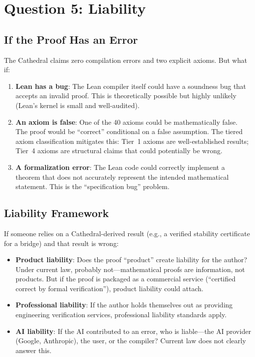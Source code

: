 \documentclass[11pt,a4paper]{article}
\begin{document}
\section{Question 5: Liability}
\label{sec:liability}

\subsection{If the Proof Has an Error}

The Cathedral claims zero compilation errors and two explicit
axioms. But what if:

\begin{enumerate}
  \item \textbf{Lean has a bug}: The Lean compiler itself could
    have a soundness bug that accepts an invalid proof. This is
    theoretically possible but highly unlikely (Lean's kernel is
    small and well-audited).

  \item \textbf{An axiom is false}: One of the 40 axioms could be
    mathematically false. The proof would be ``correct'' conditional
    on a false assumption. The tiered axiom classification mitigates
    this: Tier~1 axioms are well-established results; Tier~4 axioms
    are structural claims that could potentially be wrong.

  \item \textbf{A formalization error}: The Lean code could
    correctly implement a theorem that does not accurately represent
    the intended mathematical statement. This is the ``specification
    bug'' problem.
\end{enumerate}

\subsection{Liability Framework}

If someone relies on a Cathedral-derived result (e.g., a verified
stability certificate for a bridge) and that result is wrong:

\begin{itemize}
  \item \textbf{Product liability}: Does the proof ``product''
    create liability for the author? Under current law, probably
    not---mathematical proofs are information, not products. But
    if the proof is packaged as a commercial service (``certified
    correct by formal verification''), product liability could
    attach.

  \item \textbf{Professional liability}: If the author holds
    themselves out as providing engineering verification services,
    professional liability standards apply.

  \item \textbf{AI liability}: If the AI contributed to an error,
    who is liable---the AI provider (Google, Anthropic), the user,
    or the compiler? Current law does not clearly answer this.
\end{itemize}
\end{document}
